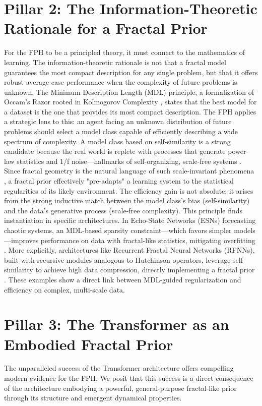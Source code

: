 \documentclass[11pt,a4paper]{article}
\begin{document}
\section{Pillar 2: The Information-Theoretic Rationale for a Fractal Prior}
For the FPH to be a principled theory, it must connect to the mathematics of learning. The information-theoretic rationale is not that a fractal model guarantees the most compact description for any single problem, but that it offers robust average-case performance when the complexity of future problems is unknown.
The Minimum Description Length (MDL) principle, a formalization of Occam's Razor rooted in Kolmogorov Complexity \citep{li2009kolmogorov}, states that the best model for a dataset is the one that provides its most compact description. The FPH applies a strategic lens to this: an agent facing an unknown distribution of future problems should select a model class capable of efficiently describing a wide spectrum of complexity. A model class based on self-similarity is a strong candidate because the real world is replete with processes that generate power-law statistics and 1/f noise—hallmarks of self-organizing, scale-free systems \citep{gershenson2025self}. Since fractal geometry is the natural language of such scale-invariant phenomena \citep{falconer2004fractal}, a fractal prior effectively "pre-adapts" a learning system to the statistical regularities of its likely environment. The efficiency gain is not absolute; it arises from the strong inductive match between the model class's bias (self-similarity) and the data's generative process (scale-free complexity).
This principle finds instantiation in specific architectures. In Echo-State Networks (ESNs) forecasting chaotic systems, an MDL-based sparsity constraint—which favors simpler models—improves performance on data with fractal-like statistics, mitigating overfitting \citep{lymburn2024reservoir}. More explicitly, architectures like Recurrent Fractal Neural Networks (RFNNs), built with recursive modules analogous to Hutchinson operators, leverage self-similarity to achieve high data compression, directly implementing a fractal prior \citep{stetter2012fractal}. These examples show a direct link between MDL-guided regularization and efficiency on complex, multi-scale data.

\section{Pillar 3: The Transformer as an Embodied Fractal Prior}
The unparalleled success of the Transformer architecture offers compelling modern evidence for the FPH. We posit that this success is a direct consequence of the architecture embodying a powerful, general-purpose fractal-like prior through its structure and emergent dynamical properties.
\end{document}
